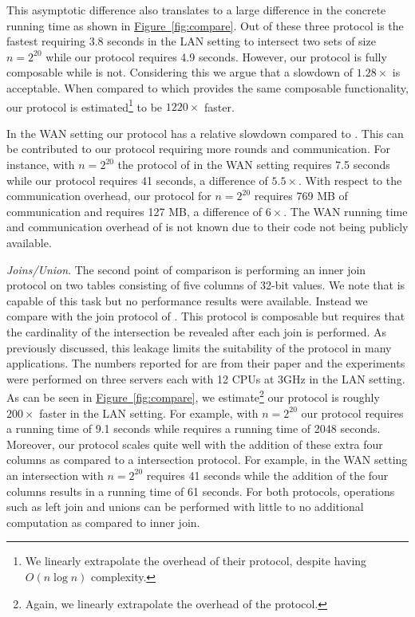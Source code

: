 \documentclass[11pt,letterpaper]{article}
\newcommand{\namedref}[2]{\hyperref[#2]{#1~\ref*{#2}}}
\newcommand{\figureref}[1]{\namedref{Figure}{#1}}
\renewcommand{\paragraph}[1]{\vspace{0.1cm}\noindent\emph{#1}.} %
\begin{document}
This asymptotic difference also translates to a large difference in the concrete running time as shown in \figureref{fig:compare}. Out of these three protocol \cite{CCS:KKRT16} is the fastest requiring 3.8 seconds in the LAN setting to intersect two sets of size $n=2^{20}$ while our protocol requires 4.9 seconds. However, our protocol is fully composable while \cite{CCS:KKRT16} is not. Considering this we argue that a slowdown of $1.28\times$ is acceptable. When compared to \cite{ASIACCS:BlaAgu12} which provides the same composable functionality, our protocol is estimated\footnote{We linearly extrapolate the overhead of their protocol, despite having $O(n\log n)$ complexity.} to be $1220\times$ faster.

In the WAN setting our protocol has a relative slowdown compared to \cite{CCS:KKRT16}. This can be contributed to our protocol requiring more rounds and communication. For instance, with $n=2^{20}$ the protocol of \cite{CCS:KKRT16} in the WAN setting requires 7.5 seconds while our protocol requires 41 seconds, a difference of $5.5\times$. With respect to the communication overhead, our protocol for $n=2^{20}$ requires 769 MB of communication and \cite{CCS:KKRT16} requires 127 MB, a difference of $6\times$. The WAN running time and communication overhead of \cite{ASIACCS:BlaAgu12} is not known due to their code not being publicly available.


\paragraph{Joins/Union} 
The second point of comparison is performing an inner join protocol on two tables consisting of five columns of 32-bit values. We note that \cite{ASIACCS:BlaAgu12} is capable of this task but no performance results were available. Instead we compare with the join protocol of \cite{LTW13}. This protocol is composable but requires that the cardinality of the intersection be revealed after each join is performed. As previously discussed, this leakage limits the suitability of the protocol in many applications. The numbers reported for \cite{LTW13} are from their paper and the experiments were performed on three servers each with 12 CPUs at 3GHz in the LAN setting. As can be seen in \figureref{fig:compare}, we estimate\footnote{Again, we linearly extrapolate the overhead of the protocol.} our protocol is roughly $200\times$ faster in the LAN setting. For example, with $n=2^{20}$ our protocol requires a running time of 9.1 seconds while \cite{LTW13} requires a running time of 2048 seconds. Moreover, our protocol scales quite well with the addition of these extra four columns as compared to a intersection protocol. For example, in the WAN setting an intersection with $n=2^{20}$ requires 41 seconds while the addition of the four columns results in a  running time of 61 seconds. For both protocols, operations such as left join and unions can be performed with little to no additional computation as compared to inner join.
\end{document}
